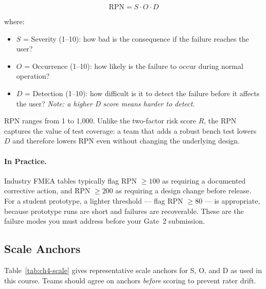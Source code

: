 \begin{equation}
  \text{RPN} = S \cdot O \cdot D
  \label{eq:ch4-rpn}
\end{equation}

\noindent where:
\begin{itemize}
  \item $S$ = Severity (1–10): how bad is the consequence if the failure reaches the user?
  \item $O$ = Occurrence (1–10): how likely is the failure to occur during normal operation?
  \item $D$ = Detection (1–10): how difficult is it to detect the failure before it affects the user?
        \emph{Note: a higher D score means harder to detect.}
\end{itemize}

RPN ranges from 1 to 1{,}000.
Unlike the two-factor risk score $R$, the RPN captures the value of test coverage: a team that adds a robust bench test lowers $D$ and therefore lowers RPN even without changing the underlying design.

\paragraph{In Practice.}
Industry FMEA tables typically flag RPN $\geq 100$ as requiring a documented corrective action, and RPN $\geq 200$ as requiring a design change before release.
For a student prototype, a lighter threshold — flag RPN $\geq 80$ — is appropriate, because prototype runs are short and failures are recoverable.
These are the failure modes you must address before your Gate~2 submission.

\subsection{Scale Anchors}
\label{subsec:ch4-scale-anchors}

Table~\ref{tab:ch4-scale} gives representative scale anchors for S, O, and D as used in this course.
Teams should agree on anchors \emph{before} scoring to prevent rater drift.

